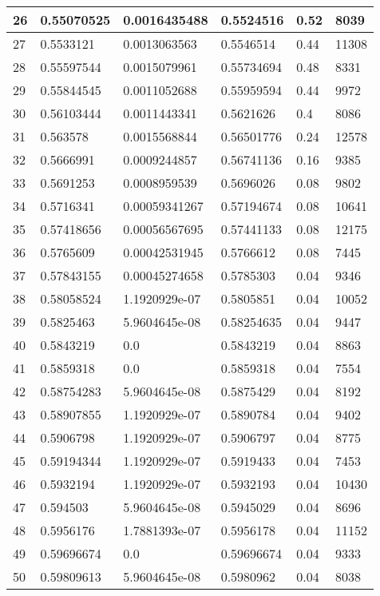 \begin{longtable}{|l|l|l|l|l|l|}
26 & 0.55070525 & 0.0016435488 & 0.5524516 & 0.52 & 8039 \\ \hline 
27 & 0.5533121 & 0.0013063563 & 0.5546514 & 0.44 & 11308 \\ \hline 
28 & 0.55597544 & 0.0015079961 & 0.55734694 & 0.48 & 8331 \\ \hline 
29 & 0.55844545 & 0.0011052688 & 0.55959594 & 0.44 & 9972 \\ \hline 
30 & 0.56103444 & 0.0011443341 & 0.5621626 & 0.4 & 8086 \\ \hline 
31 & 0.563578 & 0.0015568844 & 0.56501776 & 0.24 & 12578 \\ \hline 
32 & 0.5666991 & 0.0009244857 & 0.56741136 & 0.16 & 9385 \\ \hline 
33 & 0.5691253 & 0.0008959539 & 0.5696026 & 0.08 & 9802 \\ \hline 
34 & 0.5716341 & 0.00059341267 & 0.57194674 & 0.08 & 10641 \\ \hline 
35 & 0.57418656 & 0.00056567695 & 0.57441133 & 0.08 & 12175 \\ \hline 
36 & 0.5765609 & 0.00042531945 & 0.5766612 & 0.08 & 7445 \\ \hline 
37 & 0.57843155 & 0.00045274658 & 0.5785303 & 0.04 & 9346 \\ \hline 
38 & 0.58058524 & 1.1920929e-07 & 0.5805851 & 0.04 & 10052 \\ \hline 
39 & 0.5825463 & 5.9604645e-08 & 0.58254635 & 0.04 & 9447 \\ \hline 
40 & 0.5843219 & 0.0 & 0.5843219 & 0.04 & 8863 \\ \hline 
41 & 0.5859318 & 0.0 & 0.5859318 & 0.04 & 7554 \\ \hline 
42 & 0.58754283 & 5.9604645e-08 & 0.5875429 & 0.04 & 8192 \\ \hline 
43 & 0.58907855 & 1.1920929e-07 & 0.5890784 & 0.04 & 9402 \\ \hline 
44 & 0.5906798 & 1.1920929e-07 & 0.5906797 & 0.04 & 8775 \\ \hline 
45 & 0.59194344 & 1.1920929e-07 & 0.5919433 & 0.04 & 7453 \\ \hline 
46 & 0.5932194 & 1.1920929e-07 & 0.5932193 & 0.04 & 10430 \\ \hline 
47 & 0.594503 & 5.9604645e-08 & 0.5945029 & 0.04 & 8696 \\ \hline 
48 & 0.5956176 & 1.7881393e-07 & 0.5956178 & 0.04 & 11152 \\ \hline 
49 & 0.59696674 & 0.0 & 0.59696674 & 0.04 & 9333 \\ \hline 
50 & 0.59809613 & 5.9604645e-08 & 0.5980962 & 0.04 & 8038 \\ \hline 

\end{longtable}

